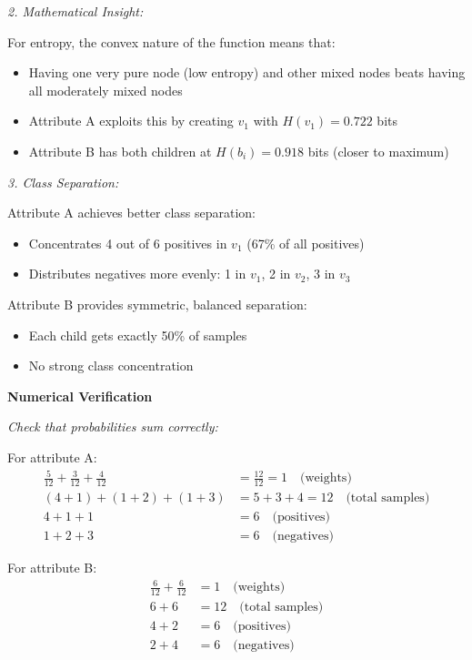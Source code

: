 \documentclass[12pt]{article}
\begin{document}
\begin{solution}
\textit{2. Mathematical Insight:}

For entropy, the convex nature of the function means that:
\begin{itemize}
    \item Having one very pure node (low entropy) and other mixed nodes beats having all moderately mixed nodes
    \item Attribute A exploits this by creating $v_1$ with $H(v_1) = 0.722$ bits
    \item Attribute B has both children at $H(b_i) = 0.918$ bits (closer to maximum)
\end{itemize}

\textit{3. Class Separation:}

Attribute A achieves better class separation:
\begin{itemize}
    \item Concentrates 4 out of 6 positives in $v_1$ (67\% of all positives)
    \item Distributes negatives more evenly: 1 in $v_1$, 2 in $v_2$, 3 in $v_3$
\end{itemize}

Attribute B provides symmetric, balanced separation:
\begin{itemize}
    \item Each child gets exactly 50\% of samples
    \item No strong class concentration
\end{itemize}

\textbf{Numerical Verification}

\textit{Check that probabilities sum correctly:}

For attribute A:
\begin{align*}
\frac{5}{12} + \frac{3}{12} + \frac{4}{12} &= \frac{12}{12} = 1 \quad \text{(weights)}\\
(4+1) + (1+2) + (1+3) &= 5 + 3 + 4 = 12 \quad \text{(total samples)} \\
4 + 1 + 1 &= 6 \quad \text{(positives)} \\
1 + 2 + 3 &= 6 \quad \text{(negatives)}
\end{align*}

For attribute B:
\begin{align*}
\frac{6}{12} + \frac{6}{12} &= 1 \quad \text{(weights)}\\
6 + 6 &= 12 \quad \text{(total samples)} \\
4 + 2 &= 6 \quad \text{(positives)} \\
2 + 4 &= 6 \quad \text{(negatives)}
\end{align*}


\end{solution}
\end{document}
